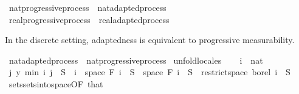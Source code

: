 \begin{isabellebody}
\ nat{\isacharunderscore}{\kern0pt}progressive{\isacharunderscore}{\kern0pt}process\ {\isasymsubseteq}\ nat{\isacharunderscore}{\kern0pt}adapted{\isacharunderscore}{\kern0pt}process%
\isadelimproof
\ %
\endisadelimproof
%
\isatagproof
\isacommand{{\isachardot}{\kern0pt}{\isachardot}{\kern0pt}}\isamarkupfalse%
%
\endisatagproof
{\isafoldproof}%
%
\isadelimproof
%
\endisadelimproof
\isanewline
{}\isamarkupfalse%
\ real{\isacharunderscore}{\kern0pt}progressive{\isacharunderscore}{\kern0pt}process\ {\isasymsubseteq}\ real{\isacharunderscore}{\kern0pt}adapted{\isacharunderscore}{\kern0pt}process%
\isadelimproof
\ %
\endisadelimproof
%
\isatagproof
\isacommand{{\isachardot}{\kern0pt}{\isachardot}{\kern0pt}}\isamarkupfalse%
%
\endisatagproof
{\isafoldproof}%
%
\isadelimproof
%
\endisadelimproof
%
\begin{isamarkuptext}%
In the discrete setting, adaptedness is equivalent to progressive measurability.%
\end{isamarkuptext}\isamarkuptrue%
\isamarkupfalse%
\ nat{\isacharunderscore}{\kern0pt}adapted{\isacharunderscore}{\kern0pt}process\ {\isasymsubseteq}\ nat{\isacharunderscore}{\kern0pt}progressive{\isacharunderscore}{\kern0pt}process\isanewline
%
\isadelimproof
%
\endisadelimproof
%
\isatagproof
{}\isamarkupfalse%
\ {\isacharparenleft}{\kern0pt}unfold{\isacharunderscore}{\kern0pt}locales{\isacharparenright}{\kern0pt}\isanewline
\ \ \isamarkupfalse%
\ i\ {\isacharcolon}{\kern0pt}{\isacharcolon}{\kern0pt}\ nat\isanewline
\ \ \isamarkupfalse%
\ {\isachardoublequoteopen}{\isacharparenleft}{\kern0pt}{\isasymlambda}{\isacharparenleft}{\kern0pt}j{\isacharcomma}{\kern0pt}\ y{\isacharparenright}{\kern0pt}{\isachardot}{\kern0pt}\ min\ i\ j{\isacharparenright}{\kern0pt}\ {\isacharminus}{\kern0pt}{\isacharbackquote}{\kern0pt}\ S\ {\isasyminter}\ {\isacharbraceleft}{\kern0pt}{}{\isachardot}{\kern0pt}{\isachardot}{\kern0pt}i{\isacharbraceright}{\kern0pt}\ {\isasymtimes}\ space\ {\isacharparenleft}{\kern0pt}F\ i{\isacharparenright}{\kern0pt}\ {\isacharequal}{\kern0pt}\ S\ {\isasymtimes}\ space\ {\isacharparenleft}{\kern0pt}F\ i{\isacharparenright}{\kern0pt}{\isachardoublequoteclose}\ \ {\isachardoublequoteopen}S\ {\isasymin}\ restrict{\isacharunderscore}{\kern0pt}space\ borel\ {\isacharbraceleft}{\kern0pt}{}{\isachardot}{\kern0pt}{\isachardot}{\kern0pt}i{\isacharbraceright}{\kern0pt}{\isachardoublequoteclose}\ \ S\ \isamarkupfalse%
\ sets{\isachardot}{\kern0pt}sets{\isacharunderscore}{\kern0pt}into{\isacharunderscore}{\kern0pt}space{\isacharbrackleft}{\kern0pt}OF\ that{\isacharbrackright}{\kern0pt}\ \isamarkupfalse%

\end{isabellebody}
